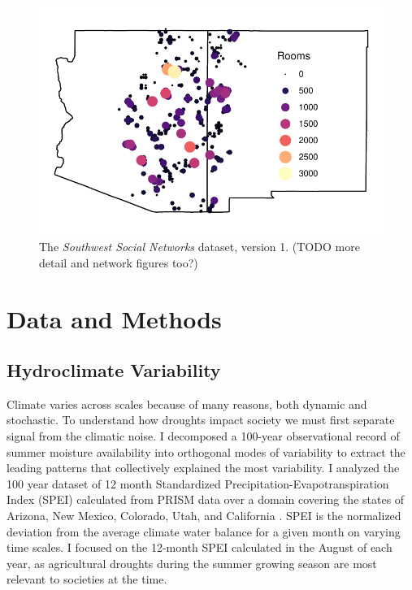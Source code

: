 \documentclass[10pt]{iopart}
\begin{document}

\begin{figure}[!htbp]
\centering
\includegraphics[width=.9\linewidth]{figures/site_distribution.pdf}
\caption{The \emph{Southwest Social Networks} dataset, version 1. (TODO more detail and network figures too?)} 
\label{fig:network-plot}
\end{figure}

\section*{Data and Methods}

\subsection*{Hydroclimate Variability}
Climate varies across scales because of many reasons, both dynamic and stochastic. To understand how droughts impact society we must first separate signal from the climatic noise. I decomposed a 100-year observational record of summer moisture availability into orthogonal modes of variability to extract the leading patterns that collectively explained the most variability. I analyzed the 100 year dataset of 12 month Standardized Precipitation-Evapotranspiration Index (SPEI) calculated from PRISM data over a domain covering the states of Arizona, New Mexico, Colorado, Utah, and California \parencite{daly}. SPEI is the normalized deviation from the average climate water balance for a given month on varying time scales. I focused on the 12-month SPEI calculated in the August of each year, as agricultural droughts during the summer growing season are most relevant to societies at the time.
\end{document}
